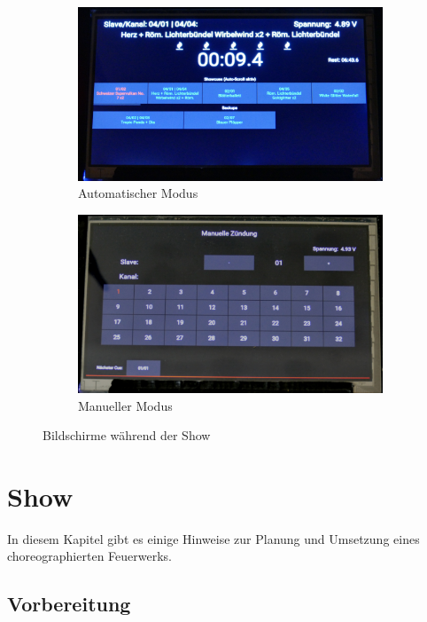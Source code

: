 \documentclass[paper=a4, parskip, numbers=noenddot, toc=listof, headsepline]{scrbook}
\begin{document}
				\begin{figure}
					\begin{subfigure}{\textwidth}
						\includegraphics{Bilder/REFautoshow}
						\caption{Automatischer Modus}
						\label{fig:REFauto}
					\end{subfigure}
					\newline
					\begin{subfigure}{\textwidth}
						\includegraphics{Bilder/REFmanualshow}
						\caption{Manueller Modus}
						\label{fig:REFmanual}
					\end{subfigure}
					\caption{Bildschirme während der Show}
				\end{figure}

	\chapter{Show}
		In diesem Kapitel gibt es einige Hinweise zur Planung und Umsetzung eines choreographierten Feuerwerks.
		\section{Vorbereitung}
\end{document}
